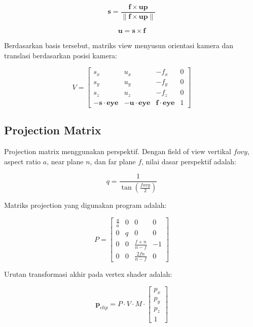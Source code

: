 \documentclass[12pt,a4paper]{article}
\begin{document}
\begin{equation}
    \mathbf{s} =
    \frac{\mathbf{f} \times \mathbf{up}}
    {\|\mathbf{f} \times \mathbf{up}\|}
\end{equation}

\begin{equation}
    \mathbf{u} = \mathbf{s} \times \mathbf{f}
\end{equation}

Berdasarkan basis tersebut, matriks view menyusun orientasi kamera dan translasi
berdasarkan posisi kamera:

\begin{equation}
    V =
    \begin{bmatrix}
        s_x & u_x & -f_x & 0 \\
        s_y & u_y & -f_y & 0 \\
        s_z & u_z & -f_z & 0 \\
        -\mathbf{s}\cdot\mathbf{eye} &
        -\mathbf{u}\cdot\mathbf{eye} &
        \mathbf{f}\cdot\mathbf{eye} & 1
    \end{bmatrix}
\end{equation}

\subsection{Projection Matrix}

Projection matrix menggunakan perspektif. Dengan field of view vertikal
$fovy$, aspect ratio $a$, near plane $n$, dan far plane $f$, nilai dasar
perspektif adalah:

\begin{equation}
    q = \frac{1}{\tan\left(\frac{fovy}{2}\right)}
\end{equation}

Matriks projection yang digunakan program adalah:

\begin{equation}
    P =
    \begin{bmatrix}
        \frac{q}{a} & 0 & 0 & 0 \\
        0 & q & 0 & 0 \\
        0 & 0 & \frac{f+n}{n-f} & -1 \\
        0 & 0 & \frac{2fn}{n-f} & 0
    \end{bmatrix}
\end{equation}

Urutan transformasi akhir pada vertex shader adalah:

\begin{equation}
    \mathbf{p}_{clip} = P \cdot V \cdot M \cdot
    \begin{bmatrix}
        p_x \\ p_y \\ p_z \\ 1
    \end{bmatrix}
\end{equation}
\end{document}
